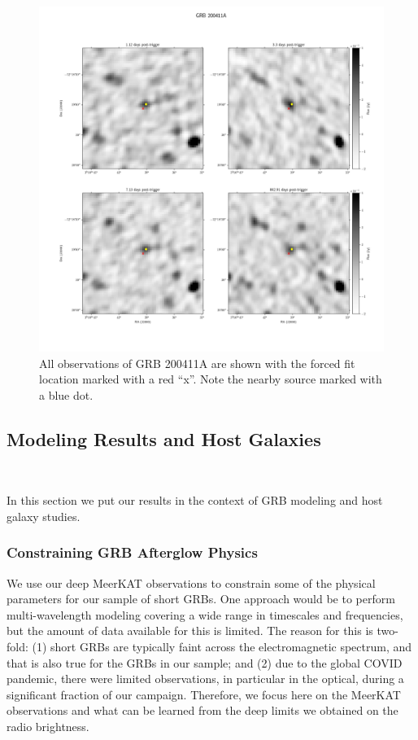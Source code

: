 \documentclass[12pt]{article}
\begin{document}
\begin{figure}
	\includegraphics[width=\textwidth]{GRB200411Aff.png}
	\caption{All observations of GRB 200411A are shown with the forced fit location marked with a red ``x''. Note the nearby source marked with a blue dot. }
	\label{fig:GRB200411Afield}
\end{figure}

\subsection{Modeling Results and Host Galaxies}
~\label{sec:methodandresult5}

In this section we put our results in the context of GRB modeling and host galaxy studies.
\subsubsection{Constraining GRB Afterglow Physics}

We use our deep MeerKAT observations to constrain some of the physical parameters for our sample of short GRBs. One approach would be to perform multi-wavelength modeling covering a wide range in timescales and frequencies, but the amount of data available for this is limited. The reason for this is two-fold: (1) short GRBs are typically faint across the electromagnetic spectrum, and that is also true for the GRBs in our sample; and (2) due to the global COVID pandemic, there were limited observations, in particular in the optical, during a significant fraction of our campaign. Therefore, we focus here on the MeerKAT observations and what can be learned from the deep limits we obtained on the radio brightness.
\end{document}
